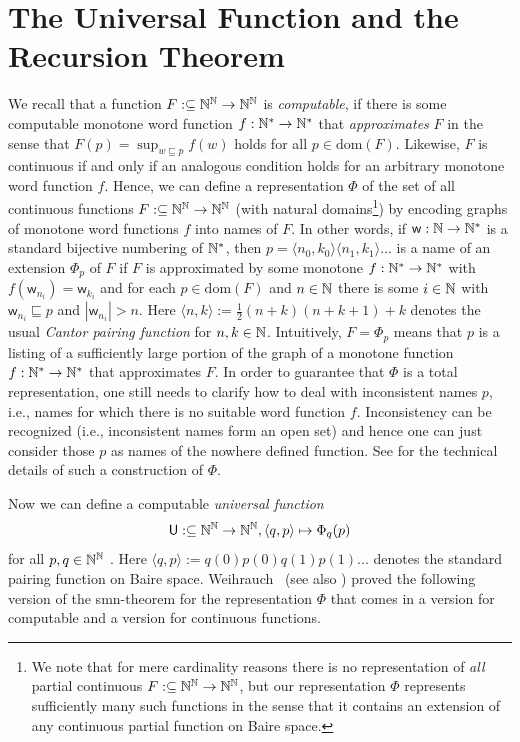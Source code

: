 \documentclass{amsart}
\def\IN{{\Bbb{N}}}
\def\In{\subseteq}
\def\prefix{\sqsubseteq}
\def\U{{\mathsf{{U}}}}
\def\w{{\mathsf{{w}}}}
\def\w{\mathsf{w}}
\def\dom{{\mathrm{dom}}}
\begin{document}
\section{The Universal Function and the Recursion Theorem}
\label{sec:recursion}

We recall that a function $F:\In\IN^\IN\to\IN^\IN$ is {\em computable}, if there is some computable monotone word function $f:\IN^*\to\IN^*$
that {\em approximates} $F$ in the sense that $F(p)=\sup_{w\prefix p}f(w)$ holds for all $p\in\dom(F)$. 
Likewise, $F$ is continuous if and only if an analogous condition holds for an arbitrary monotone word function $f$.
Hence, we can define a representation $\Phi$ of the set of all continuous functions $F:\In\IN^\IN\to\IN^\IN$ (with natural domains\footnote{We note that for mere cardinality reasons
there is no representation of {\em all} partial continuous $F:\In\IN^\IN\to\IN^\IN$, but our representation $\Phi$ represents sufficiently many such functions in the sense that it 
contains an extension of any continuous partial function on Baire space.}) 
by encoding graphs of monotone word functions $f$ into names of $F$. In other words, if $\w:\IN\to\IN^*$ is a standard bijective numbering 
of $\IN^*$, then $p=\langle n_0,k_0\rangle\langle n_1,k_1\rangle...$ is a name of an extension $\Phi_p$ of $F$ if $F$ is approximated by some monotone $f:\IN^*\to\IN^*$ with
$f(\w_{n_i})=\w_{k_i}$ and for each $p\in\dom(F)$ and $n\in\IN$ there is some $i\in\IN$ with $\w_{n_i}\prefix p$ and $|\w_{n_i}|>n$.
Here $\langle n,k\rangle:=\frac{1}{2}(n+k)(n+k+1)+k$ denotes the usual {\em Cantor pairing function} for $n,k\in\IN$. 
Intuitively, $F=\Phi_p$ means that $p$ is a listing of a sufficiently large portion of the graph of a monotone function $f:\IN^*\to\IN^*$ that approximates $F$.
In order to guarantee that $\Phi$ is a total representation, one still needs to clarify how to deal with inconsistent names $p$,
i.e., names for which there is no suitable word function $f$. 
Inconsistency can be recognized (i.e., inconsistent names form an open set) and hence
one can just consider those $p$ as names of the nowhere defined function.
See \cite[Definition~3.2.9]{Wei87} for the technical details of such a construction of $\Phi$.

Now we can define a computable {\em universal function} 
\[\U:\In\IN^\IN\to\IN^\IN,\langle q,p\rangle\mapsto\Phi_q(p)\] 
for all $p,q\in\IN^\IN$ \cite[Theorem~3.2.16~(1)]{Wei87}. Here $\langle q,p\rangle:=q(0)p(0)q(1)p(1)...$ denotes the standard pairing function on Baire space.
Weihrauch~\cite[Theorems~3.5, 2.10, Corollary~2.11]{Wei85} (see also \cite[Theorem~3.2.16]{Wei87}) proved the following version of the smn-theorem for the representation $\Phi$
that comes in a version for computable and a version for continuous functions.
\end{document}
